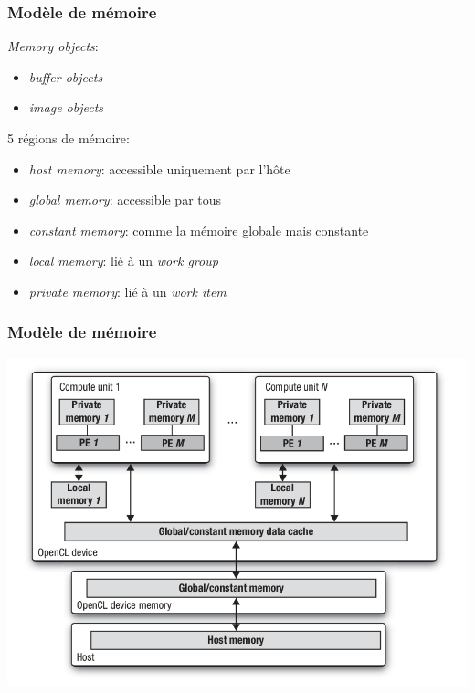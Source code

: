 \begin{frame}
    \frametitle{Modèle de mémoire}
    \textit{Memory objects}:\pause{}
    \begin{itemize}
        \item \textit{buffer objects}
        \item \textit{image objects}
    \end{itemize}\pause{}
    \vspace{20pt}

    5 régions de mémoire:\pause{}
    \begin{itemize}
        \item \textit{host memory}: accessible uniquement par l'hôte\pause{}
        \item \textit{global memory}: accessible par tous\pause{}
        \item \textit{constant memory}: comme la mémoire globale mais constante\pause{}
        \item \textit{local memory}: lié à un \textit{work group}\pause{}
        \item \textit{private memory}: lié à un \textit{work item}
    \end{itemize}
\end{frame}

\begin{frame}
    \frametitle{Modèle de mémoire}
    \includegraphics[width=\textwidth]{../resources/memory_model.png}
\end{frame}
